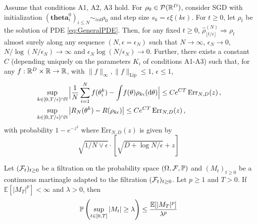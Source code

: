 \documentclass{article}
\begin{document}
\begin{theorem}[PM. Nguyen et al. (2018)]\label{thm: mean field nguyen}
Assume that conditions {\sf A1}, {\sf A2}, {\sf A3} hold.
For $\rho_0\in\mathcal{P}(\mathbb{R}^D)$, consider SGD with initialization $(\mathbf{theta}^0_i)_{i\leq N}\sim_{iid}\rho_0$ and step size $s_k = \epsilon \xi(k \epsilon)$. For $t\geq 0$, let $\rho_t$ be the solution of PDE \ref{eq:GeneralPDE}.
Then, for any fixed $t \geq 0$,  $\hat{\rho}^{(N)}_{\lfloor t / \epsilon \rfloor} \Rightarrow \rho_{t}$ almost surely along any sequence $(N,\epsilon = \epsilon_N)$ such that $N \to \infty$, $\epsilon_N \to 0$, $N/\log (N/\epsilon_N) \to\infty$ and $\epsilon_N \log(N / \epsilon_N)\to 0$.
Further, there exists a constant $C$  (depending uniquely on the parameters $K_i$ of conditions {\sf A1}-{\sf A3}) such that,
for any $f:\mathbb{R}^D\times \mathbb{R}\to\mathbb{R}$, with $\|f\|_{\infty}, \|f\|_{\text{Lip}}\leq 1$, $\epsilon\leq 1$,
%
\begin{align}\label{eq: big theorem nguyen}
%
&\sup_{k \in  [0, T/\epsilon] \cap \N}\Big|\frac{1}{N}\sum_{i=1}^Nf(\mathbf{\theta}^{k}_i)- \int\!
  f(\mathbf{\theta})  \rho_{k\epsilon}(\diff \mathbf{\theta}) \Big| \leq Ce^{CT}\,\text{Err}_{N,D}(z)\, ,\nonumber\\
&\sup_{k \in  [0, T/\epsilon] \cap \N}\big|R_{N}(\mathbf{\theta}^{k})-R(\rho_{k\epsilon})\big| \leq Ce^{CT}\,\text{Err}_{N,D}(z)\, ,
%
\end{align} 
%
with probability $1- e^{-z^2}$ where $\text{Err}_{N,D}(z)$ is given by
\begin{equation}
	\sqrt{1/N\lor \epsilon}\cdot \left[ \sqrt{D + \log N/\epsilon}+z \right]
\end{equation}

\end{theorem}


\begin{theorem}\label{thm: Doob}
	Let $ (\mathcal{F}_{t})_{t\geq 0}$ be a filtration on the probability space $ (\Omega, \mathcal{F}, \mathbb{P})$ and $ (M_{t})_{t\geq 0}$ be a continuous martinagle adapted to the filtration $ (\mathcal{F}_{t})_{t\geq 0}$. Let $ p\geq 1$ and $ T>0$. If $\mathbb{E}[|M_{T}|^{p}]<\infty$ and $ \lambda > 0$, then 
	\begin{equation}
		\mathbb{P}\left(\displaystyle\sup_{t\in [0,T]}|M_{t}|\geq \lambda\right)\leq \frac{\mathbb{E}[|M_{T}|^{p}]}{\lambda^{p}}
	\end{equation}
	
\end{theorem}
\end{document}
